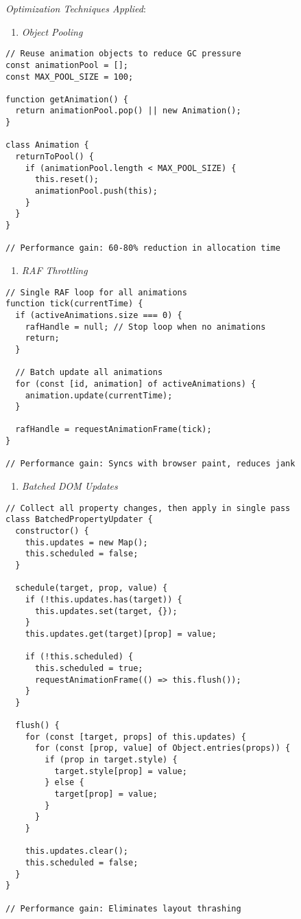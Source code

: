\documentclass[11pt]{article}
\begin{document}
\emph{Optimization Techniques Applied}:

\begin{enumerate}
\item \emph{Object Pooling}
\end{enumerate}
\begin{verbatim}
// Reuse animation objects to reduce GC pressure
const animationPool = [];
const MAX_POOL_SIZE = 100;

function getAnimation() {
  return animationPool.pop() || new Animation();
}

class Animation {
  returnToPool() {
    if (animationPool.length < MAX_POOL_SIZE) {
      this.reset();
      animationPool.push(this);
    }
  }
}

// Performance gain: 60-80% reduction in allocation time
\end{verbatim}

\begin{enumerate}
\item \emph{RAF Throttling}
\end{enumerate}
\begin{verbatim}
// Single RAF loop for all animations
function tick(currentTime) {
  if (activeAnimations.size === 0) {
    rafHandle = null; // Stop loop when no animations
    return;
  }
  
  // Batch update all animations
  for (const [id, animation] of activeAnimations) {
    animation.update(currentTime);
  }
  
  rafHandle = requestAnimationFrame(tick);
}

// Performance gain: Syncs with browser paint, reduces jank
\end{verbatim}

\begin{enumerate}
\item \emph{Batched DOM Updates}
\end{enumerate}
\begin{verbatim}
// Collect all property changes, then apply in single pass
class BatchedPropertyUpdater {
  constructor() {
    this.updates = new Map();
    this.scheduled = false;
  }
  
  schedule(target, prop, value) {
    if (!this.updates.has(target)) {
      this.updates.set(target, {});
    }
    this.updates.get(target)[prop] = value;
    
    if (!this.scheduled) {
      this.scheduled = true;
      requestAnimationFrame(() => this.flush());
    }
  }
  
  flush() {
    for (const [target, props] of this.updates) {
      for (const [prop, value] of Object.entries(props)) {
        if (prop in target.style) {
          target.style[prop] = value;
        } else {
          target[prop] = value;
        }
      }
    }
    
    this.updates.clear();
    this.scheduled = false;
  }
}

// Performance gain: Eliminates layout thrashing
\end{verbatim}
\end{document}
